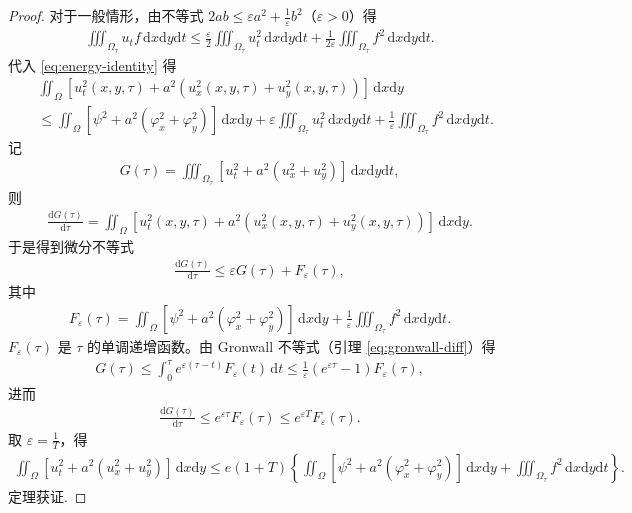 \documentclass[../../main.tex]{subfiles}%
\begin{document}
\begin{proof}
对于一般情形，由不等式 $2ab\leqslant \varepsilon a^2+\frac{1}{\varepsilon}b^2$（$\varepsilon>0$）得
\begin{align*}
\iiint_{\Omega_\tau}u_tf\,\mathrm{d}x\mathrm{d}y\mathrm{d}t
\leqslant \frac{\varepsilon}{2}\iiint_{\Omega_\tau}u_t^2\,\mathrm{d}x\mathrm{d}y\mathrm{d}t+\frac{1}{2\varepsilon}\iiint_{\Omega_\tau}f^2\,\mathrm{d}x\mathrm{d}y\mathrm{d}t.
\end{align*}
代入 \eqref{eq:energy-identity} 得
\begin{align*}
&\iint_\Omega [u_t^2(x,y,\tau)+a^2(u_x^2(x,y,\tau)+u_y^2(x,y,\tau))]\,\mathrm{d}x\mathrm{d}y \\
&\leqslant \iint_\Omega[\psi^2+a^2(\varphi_x^2+\varphi_y^2)]\,\mathrm{d}x\mathrm{d}y
+\varepsilon\iiint_{\Omega_\tau}u_t^2\,\mathrm{d}x\mathrm{d}y\mathrm{d}t+\frac{1}{\varepsilon}\iiint_{\Omega_\tau}f^2\,\mathrm{d}x\mathrm{d}y\mathrm{d}t.
\end{align*}
记
\begin{align*}
G(\tau)=\iiint_{\Omega_\tau}[u_t^2+a^2(u_x^2+u_y^2)]\,\mathrm{d}x\mathrm{d}y\mathrm{d}t,
\end{align*}
则
\begin{align*}
\frac{\mathrm{d}G(\tau)}{\mathrm{d}\tau}=\iint_\Omega [u_t^2(x,y,\tau)+a^2(u_x^2(x,y,\tau)+u_y^2(x,y,\tau))]\,\mathrm{d}x\mathrm{d}y.
\end{align*}
于是得到微分不等式
\begin{align*}
\frac{\mathrm{d}G(\tau)}{\mathrm{d}\tau}\leqslant \varepsilon G(\tau)+F_\varepsilon(\tau),
\end{align*}
其中
\begin{align*}
F_\varepsilon(\tau)=\iint_\Omega[\psi^2+a^2(\varphi_x^2+\varphi_y^2)]\,\mathrm{d}x\mathrm{d}y+\frac{1}{\varepsilon}\iiint_{\Omega_\tau}f^2\,\mathrm{d}x\mathrm{d}y\mathrm{d}t.
\end{align*}
$F_\varepsilon(\tau)$ 是 $\tau$ 的单调递增函数。由 Gronwall 不等式（引理 \eqref{eq:gronwall-diff}）得
\begin{align*}
G(\tau)\leqslant \int_0^\tau e^{\varepsilon(\tau-t)}F_\varepsilon(t)\,\mathrm{d}t\leqslant \frac{1}{\varepsilon}(e^{\varepsilon\tau}-1)F_\varepsilon(\tau),
\end{align*}
进而
\begin{align*}
\frac{\mathrm{d}G(\tau)}{\mathrm{d}\tau}\leqslant e^{\varepsilon\tau}F_\varepsilon(\tau)\leqslant e^{\varepsilon T}F_\varepsilon(\tau).
\end{align*}
取 $\varepsilon=\frac{1}{T}$，得
\begin{align*}
\iint_\Omega [u_t^2+a^2(u_x^2+u_y^2)]\,\mathrm{d}x\mathrm{d}y
\leqslant e(1+T)\left\{\iint_\Omega[\psi^2+a^2(\varphi_x^2+\varphi_y^2)]\,\mathrm{d}x\mathrm{d}y+\iiint_{\Omega_\tau}f^2\,\mathrm{d}x\mathrm{d}y\mathrm{d}t\right\}.
\end{align*}
定理获证.
\end{proof}
\end{document}
